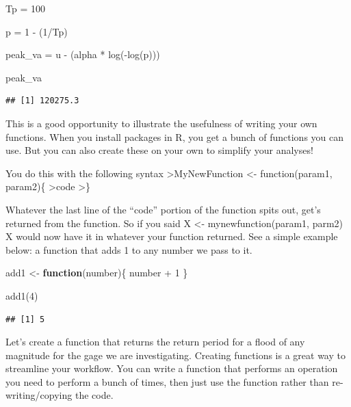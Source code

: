 \documentclass[
]{book}
\newenvironment{Shaded}{\begin{snugshade}}{\end{snugshade}}
\newcommand{\ControlFlowTok}[1]{\textcolor[rgb]{0.13,0.29,0.53}{\textbf{#1}}}
\newcommand{\DecValTok}[1]{\textcolor[rgb]{0.00,0.00,0.81}{#1}}
\newcommand{\FunctionTok}[1]{\textcolor[rgb]{0.00,0.00,0.00}{#1}}
\newcommand{\NormalTok}[1]{#1}
\newcommand{\OtherTok}[1]{\textcolor[rgb]{0.56,0.35,0.01}{#1}}
\newcommand{\SpecialCharTok}[1]{\textcolor[rgb]{0.00,0.00,0.00}{#1}}
\begin{document}
\begin{Shaded}
\begin{Highlighting}[]
\NormalTok{Tp }\OtherTok{=} \DecValTok{100}

\NormalTok{p }\OtherTok{=} \DecValTok{1} \SpecialCharTok{{-}}\NormalTok{ (}\DecValTok{1}\SpecialCharTok{/}\NormalTok{Tp)}

\NormalTok{peak\_va }\OtherTok{=}\NormalTok{ u }\SpecialCharTok{{-}}\NormalTok{ (alpha }\SpecialCharTok{*} \FunctionTok{log}\NormalTok{(}\SpecialCharTok{{-}}\FunctionTok{log}\NormalTok{(p)))}

\NormalTok{peak\_va}
\end{Highlighting}
\end{Shaded}

\begin{verbatim}
## [1] 120275.3
\end{verbatim}

This is a good opportunity to illustrate the usefulness of writing your own functions. When you install packages in R, you get a bunch of functions you can use. But you can also create these on your own to simplify your analyses!

You do this with the following syntax
\textgreater MyNewFunction \textless- function(param1, param2)\{
\textgreater code
\textgreater\}

Whatever the last line of the ``code'' portion of the function spits out, get's returned from the function. So if you said X \textless- mynewfunction(param1, parm2) X would now have it in whatever your function returned. See a simple example below: a function that adds 1 to any number we pass to it.

\begin{Shaded}
\begin{Highlighting}[]
\NormalTok{add1 }\OtherTok{\textless{}{-}} \ControlFlowTok{function}\NormalTok{(number)\{}
\NormalTok{          number }\SpecialCharTok{+} \DecValTok{1}
\NormalTok{          \}}

\FunctionTok{add1}\NormalTok{(}\DecValTok{4}\NormalTok{)}
\end{Highlighting}
\end{Shaded}

\begin{verbatim}
## [1] 5
\end{verbatim}

Let's create a function that returns the return period for a flood of any magnitude for the gage we are investigating. Creating functions is a great way to streamline your workflow. You can write a function that performs an operation you need to perform a bunch of times, then just use the function rather than re-writing/copying the code.
\end{document}
